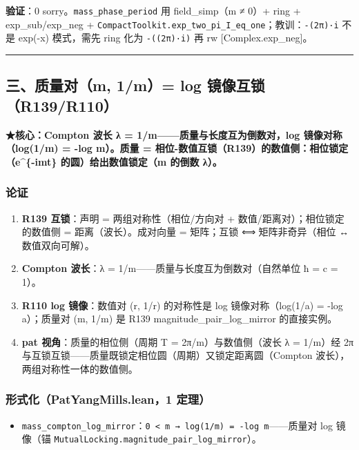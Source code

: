 \documentclass[
]{article}
\providecommand{\tightlist}{%
 \setlength{\itemsep}{0pt}\setlength{\parskip}{0pt}}
\begin{document}
\textbf{验证}：0 sorry。\texttt{mass\_phase\_period} 用 field\_simp（m ≠
0）+ ring + exp\_sub/exp\_neg +
\texttt{CompactToolkit.exp\_two\_pi\_I\_eq\_one}；教训：\texttt{-(2π)·i}
不是 exp(-x) 模式，需先 ring 化为 \texttt{-((2π)·i)} 再 rw
{[}Complex.exp\_neg{]}。

\begin{center}\rule{0.5\linewidth}{0.5pt}\end{center}

\subsection{三、质量对（m, 1/m）= log
镜像互锁（R139/R110）}\label{ux4e09ux8d28ux91cfux5bf9m-1m-log-ux955cux50cfux4e92ux9501r139r110}

\textbf{★核心：Compton 波长 λ = 1/m------质量与长度互为倒数对，log
镜像对称（log(1/m) = -log m）。质量 =
相位-数值互锁（R139）的数值侧：相位锁定（e\^{}\{-imt\}
的圆）给出数值锁定（m 的倒数 λ）。}

\subsubsection{论证}\label{ux8bbaux8bc1-2}

\begin{enumerate}
\def\labelenumi{\arabic{enumi}.}
\tightlist
\item
 \textbf{R139 互锁}：声明 = 两组对称性（相位/方向对 +
 数值/距离对）；相位锁定的数值侧 = 距离（波长）。成对向量 = 矩阵；互锁
 ⟺ 矩阵非奇异（相位 ↔ 数值双向可解）。
\item
 \textbf{Compton 波长}：λ = 1/m------质量与长度互为倒数对（自然单位 ħ =
 c = 1）。
\item
 \textbf{R110 log 镜像}：数值对 (r, 1/r) 的对称性是 log
 镜像对称（log(1/a) = -log a）；质量对 (m, 1/m) 是 R139
 magnitude\_pair\_log\_mirror 的直接实例。
\item
 \textbf{pat 视角}：质量的相位侧（周期 T = 2π/m）与数值侧（波长 λ =
 1/m）经 2π
 与互锁互锁------质量既锁定相位圆（周期）又锁定距离圆（Compton
 波长），两组对称性一体的数值侧。
\end{enumerate}

\subsubsection{形式化（PatYangMills.lean，1
定理）}\label{ux5f62ux5f0fux5316patyangmills.lean1-ux5b9aux7406-1}

\begin{itemize}
\tightlist
\item
 \texttt{mass\_compton\_log\_mirror}：\texttt{0\ \textless{}\ m\ →\ log(1/m)\ =\ -log\ m}------质量对
 log 镜像（锚 \texttt{MutualLocking.magnitude\_pair\_log\_mirror}）。
\end{itemize}
\end{document}
